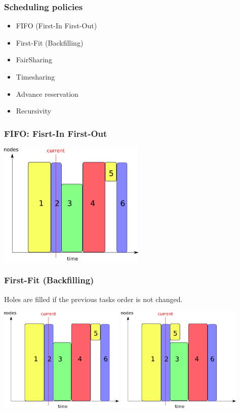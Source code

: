\documentclass{beamer}
\begin{document}
\begin{frame}
	\frametitle{Scheduling policies}
		\begin{itemize}
		\item FIFO (First-In First-Out)
		\item First-Fit (Backfilling)
		\item FairSharing
		\item Timesharing
		\item Advance reservation
		\item Recursivity
	\end{itemize}

\end{frame}

\begin{frame}
	\frametitle{FIFO: Fisrt-In First-Out}
	\begin{center}
		\includegraphics[width=7cm]{fifo.png}
	\end{center}

\end{frame}

\begin{frame}
	\frametitle{ First-Fit (Backfilling)}
        Holes are filled if the previous tasks order is not changed.
	\begin{center}
			\includegraphics[width=6cm]{fifo.png}
		\includegraphics[width=6cm]{cbf.png}
	\end{center}

\end{frame}
\end{document}
